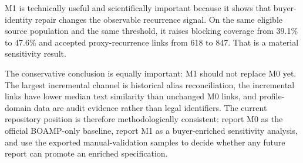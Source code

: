 \documentclass[11pt]{article}
\begin{document}
M1 is technically useful and scientifically important because it shows that
buyer-identity repair changes the observable recurrence signal. On the
same eligible source population and the same threshold, it raises blocking
coverage from 39.1\% to 47.6\% and accepted proxy-recurrence links from
618 to 847. That is a material sensitivity result.

The conservative conclusion is equally important: M1 should not replace M0
yet. The largest incremental channel is historical alias reconciliation,
the incremental links have lower median text similarity than unchanged M0
links, and profile-domain data are audit evidence rather than legal
identifiers. The current repository position is therefore methodologically
consistent: report M0 as the official BOAMP-only baseline, report M1 as a
buyer-enriched sensitivity analysis, and use the exported manual-validation
samples to decide whether any future report can promote an enriched
specification.
\end{document}
